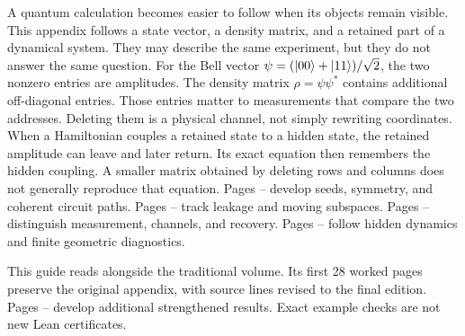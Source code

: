A quantum calculation becomes easier to follow when its objects remain visible. This appendix follows a state vector, a density matrix, and a retained part of a dynamical system. They may describe the same experiment, but they do not answer the same question.
For the Bell vector $\psi=(\lvert 00\rangle+\lvert 11\rangle)/\sqrt2$, the two nonzero entries are amplitudes. The density matrix $\rho=\psi\psi^*$ contains additional off-diagonal entries. Those entries matter to measurements that compare the two addresses. Deleting them is a physical channel, not simply rewriting coordinates.
When a Hamiltonian couples a retained state to a hidden state, the retained amplitude can leave and later return. Its exact equation then remembers the hidden coupling. A smaller matrix obtained by deleting rows and columns does not generally reproduce that equation.
Pages -- develop seeds, symmetry, and coherent circuit paths. Pages -- track leakage and moving subspaces. Pages -- distinguish measurement, channels, and recovery. Pages -- follow hidden dynamics and finite geometric diagnostics.

This guide reads alongside the traditional volume. Its first 28 worked pages preserve the original appendix, with source lines revised to the final edition. Pages -- develop additional strengthened results. Exact example checks are not new Lean certificates.

